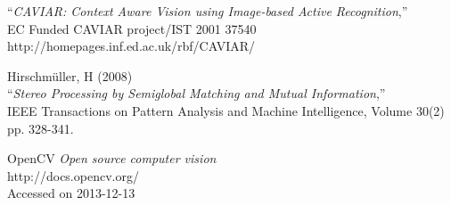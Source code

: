 \begin{thebibliography}{9}
	``\textit{CAVIAR: Context Aware Vision using Image-based Active Recognition},''\\
	EC Funded CAVIAR project/IST 2001 37540\\
	http://homepages.inf.ed.ac.uk/rbf/CAVIAR/
	
	Hirschmüller, H (2008)\\
	``\textit{Stereo Processing by Semiglobal Matching and Mutual Information},''\\
	IEEE Transactions on Pattern Analysis and Machine Intelligence, Volume 30(2)
	pp. 328-341.
	
	OpenCV \textit{Open source computer vision}\\
	http://docs.opencv.org/\\
	Accessed on 2013-12-13\\
	


\end{thebibliography}
